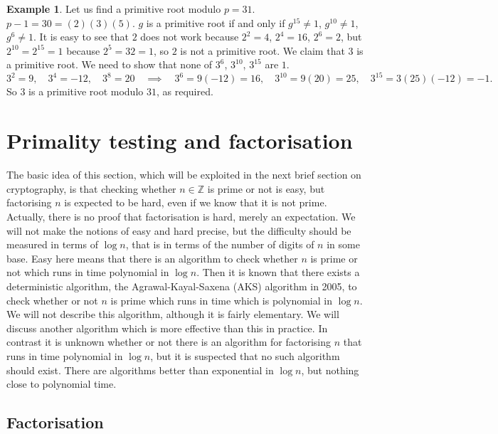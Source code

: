 \documentclass{article}
\newcommand{\Z}{\mathbb{Z}}
\newcommand{\rb}[1]{\left( #1 \right)}
\theoremstyle{definition}\newtheorem{definition}{Definition}
\theoremstyle{definition}\newtheorem{remark}[definition]{Remark}
\theoremstyle{definition}\newtheorem*{example}{Example}
\theoremstyle{definition}\newtheorem*{note}{Note}
\begin{document}
\begin{example}
Let us find a primitive root modulo $ p = 31 $. $ p - 1 = 30 = \rb{2}\rb{3}\rb{5} $. $ g $ is a primitive root if and only if $ g^{15} \ne 1 $, $ g^{10} \ne 1 $, $ g^{6} \ne 1 $. It is easy to see that $ 2 $ does not work because $ 2^2 = 4 $, $ 2^4 = 16 $, $ 2^6 = 2 $, but $ 2^10 = 2^15 = 1 $ because $ 2^5 = 32 = 1 $, so $ 2 $ is not a primitive root. We claim that $ 3 $ is a primitive root. We need to show that none of $ 3^6 $, $ 3^{10} $, $ 3^{15} $ are $ 1 $.
$$ 3^2 = 9, \quad 3^4 = -12, \quad 3^8 = 20 \quad \implies \quad 3^6 = 9\rb{-12} = 16, \quad 3^{10} = 9\rb{20} = 25, \quad 3^{15} = 3\rb{25}\rb{-12} = -1. $$
So $ 3 $ is a primitive root modulo $ 31 $, as required.
\end{example}

\section{Primality testing and factorisation}

The basic idea of this section, which will be exploited in the next brief section on cryptography, is that checking whether $ n \in \Z $ is prime or not is easy, but factorising $ n $ is expected to be hard, even if we know that it is not prime. Actually, there is no proof that factorisation is hard, merely an expectation. We will not make the notions of easy and hard precise, but the difficulty should be measured in terms of $ \log n $, that is in terms of the number of digits of $ n $ in some base. Easy here means that there is an algorithm to check whether $ n $ is prime or not which runs in time polynomial in $ \log n $. Then it is known that there exists a deterministic algorithm, the Agrawal-Kayal-Saxena (AKS) algorithm in 2005, to check whether or not $ n $ is prime which runs in time which is polynomial in $ \log n $. We will not describe this algorithm, although it is fairly elementary. We will discuss another algorithm which is more effective than this in practice. In contrast it is unknown whether or not there is an algorithm for factorising $ n $ that runs in time polynomial in $ \log n $, but it is suspected that no such algorithm should exist. There are algorithms better than exponential in $ \log n $, but nothing close to polynomial time.

\subsection{Factorisation}
\end{document}
